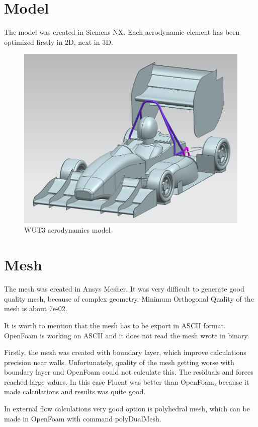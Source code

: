 \section{Model}
The model was created in Siemens NX. Each aerodynamic element has been optimized firstly in 2D, next in 3D. 


\begin{figure}[h!]
\includegraphics[width=\textwidth]{img/final}
\caption{WUT3 aerodynamics model}
\end{figure}



\section{Mesh}
The mesh was created in Ansys Mesher. It was very difficult to generate good quality mesh, because of complex geometry. Minimum Orthogonal Quality of the mesh is about 7e-02.

It is worth to mention that the mesh has to be export in ASCII format. OpenFoam is working on ASCII and it does not read the mesh wrote in binary. 

Firstly, the mesh was created with boundary layer, which improve calculations precision near walls. Unfortunately, quality of the mesh getting worse with boundary layer and OpenFoam could not calculate this. The residuals and forces reached large values. In this case Fluent was better than OpenFoam, because it made calculations and results was quite good.

In external flow calculations very good option is polyhedral mesh, which can be made in OpenFoam with command polyDualMesh. 

